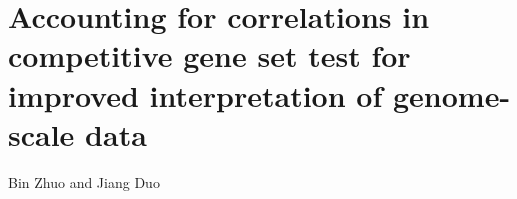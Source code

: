 \section{Accounting for correlations in competitive gene set
	test for improved interpretation of genome-scale data}\label{chap3}

\vspace*{5cm}
\begin{centering}
	{\normalsize Bin Zhuo and Jiang Duo}\\[.04\textheight]
\end{centering}	
\vspace*{5cm}

\newpage


	\begin{abstract}
	Competitive gene set test is a widely used tool for interpreting high-throughput biological 
	data,such as gene expression and proteomics data. It aims at testing categories of genes for 
	enriched association signals in a list of genes inferred from genome-wide data. Most 
	conventional enrichment testing methods ignore or do not properly account for the widespread 
	correlations among genes, which, as we show, can result in inflated type I error rates and 
	power loss. We propose a new framework, \OurMethod, for gene set test based on a mixed effects 
	quasi-likelihood model, where the data are not required to be Gaussian. Our method effectively 
	adjusts for completely unknown,	unstructured correlations among the genes. It uses a score test 
	approach and allows for analytical assessment of $p$-values. Compared to existing methods such 
	as GSEA and CAMERA, our method enjoys robust and substantially improved control over type 1 
	error and maintains good power in a variety of correlation structure and association settings. 
	We also present two real data analysis to illustrate our approach.
	\end{abstract}
	
	
